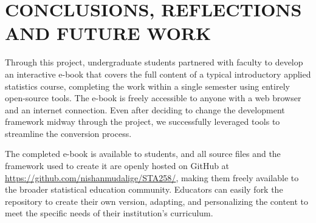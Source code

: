 \documentclass[11pt]{article}
\begin{document}




\section{CONCLUSIONS, REFLECTIONS AND FUTURE WORK}

Through this project, undergraduate students partnered with faculty to develop an interactive e-book that covers the full content of a typical introductory applied statistics course, completing the work within a single semester using entirely open-source tools. The e-book is freely accessible to anyone with a web browser and an internet connection. Even after deciding to change the development framework midway through the project, we successfully leveraged tools to streamline the conversion process.

The completed e-book is available to students, and all source files and the framework used to create it are openly hosted on GitHub at \href{https://github.com/nishanmudalige/STA258/}{https://github.com/nishanmudalige/STA258/}, making them freely available to the broader statistical education community. Educators can easily fork the repository to create their own version, adapting, and personalizing the content to meet the specific needs of their institution’s curriculum.
\end{document}
